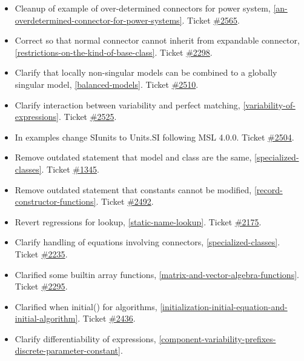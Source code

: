 \begin{itemize}
\item Cleanup of example of over-determined connectors for power system, \cref{an-overdetermined-connector-for-power-systems}.
Ticket \href{https://github.com/modelica/ModelicaSpecification/pull/2565}{\#2565}.
\item Correct so that normal connector cannot inherit from expandable connector, \cref{restrictions-on-the-kind-of-base-class}.
Ticket \href{https://github.com/modelica/ModelicaSpecification/issues/2298}{\#2298}.
\item Clarify that locally non-singular models can be combined to a globally singular model, \cref{balanced-models}.
Ticket \href{https://github.com/modelica/ModelicaSpecification/issues/2510}{\#2510}.
\item Clarify interaction between variability and perfect matching, \cref{variability-of-expressions}.
Ticket \href{https://github.com/modelica/ModelicaSpecification/issues/2525}{\#2525}.
\item In examples change SIunits to Units.SI following MSL 4.0.0.
Ticket \href{https://github.com/modelica/ModelicaSpecification/pull/2504}{\#2504}.
\item Remove outdated statement that model and class are the same, \cref{specialized-classes}.
Ticket \href{https://github.com/modelica/ModelicaSpecification/issues/1345}{\#1345}.
\item Remove outdated statement that constants cannot be modified, \cref{record-constructor-functions}.
Ticket \href{https://github.com/modelica/ModelicaSpecification/issues/2492}{\#2492}.
\item Revert regressions for lookup, \cref{static-name-lookup}.
Ticket \href{https://github.com/modelica/ModelicaSpecification/issues/2175}{\#2175}.
\item Clarify handling of equations involving connectors, \cref{specialized-classes}.
Ticket \href{https://github.com/modelica/ModelicaSpecification/issues/2235}{\#2235}.
\item Clarified some builtin array functions, \cref{matrix-and-vector-algebra-functions}.
Ticket \href{https://github.com/modelica/ModelicaSpecification/issues/2295}{\#2295}.
\item Clarified when initial() for algorithms, \cref{initialization-initial-equation-and-initial-algorithm}.
Ticket \href{https://github.com/modelica/ModelicaSpecification/issues/2436}{\#2436}.
\item Clarify differentiability of expressions, \cref{component-variability-prefixes-discrete-parameter-constant}.

\end{itemize}
